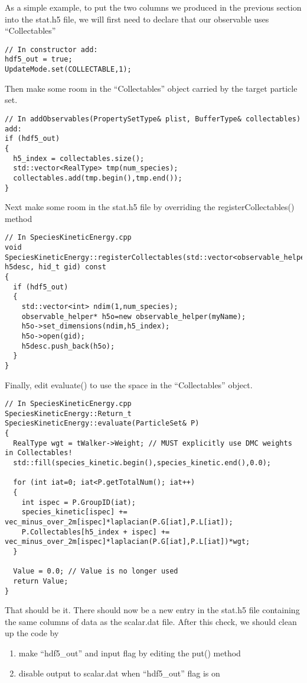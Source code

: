 As a simple example, to put the two columns we produced in the previous section into the stat.h5 file, we will first need to declare that our observable uses ``Collectables''
\begin{lstlisting}[style=C++]
// In constructor add: 
hdf5_out = true;
UpdateMode.set(COLLECTABLE,1);
\end{lstlisting}
Then make some room in the ``Collectables'' object carried by the target particle set.
\begin{lstlisting}[style=C++]
// In addObservables(PropertySetType& plist, BufferType& collectables) add:
if (hdf5_out)
{
  h5_index = collectables.size();
  std::vector<RealType> tmp(num_species);
  collectables.add(tmp.begin(),tmp.end());
}
\end{lstlisting}
Next make some room in the stat.h5 file by overriding the registerCollectables() method
\begin{lstlisting}[style=C++]
// In SpeciesKineticEnergy.cpp
void SpeciesKineticEnergy::registerCollectables(std::vector<observable_helper*>& h5desc, hid_t gid) const
{
  if (hdf5_out)
  {
    std::vector<int> ndim(1,num_species);
    observable_helper* h5o=new observable_helper(myName);
    h5o->set_dimensions(ndim,h5_index);
    h5o->open(gid);
    h5desc.push_back(h5o);
  }
}
\end{lstlisting}
Finally, edit evaluate() to use the space in the ``Collectables'' object.
\begin{lstlisting}[style=C++]
// In SpeciesKineticEnergy.cpp
SpeciesKineticEnergy::Return_t SpeciesKineticEnergy::evaluate(ParticleSet& P)
{
  RealType wgt = tWalker->Weight; // MUST explicitly use DMC weights in Collectables!
  std::fill(species_kinetic.begin(),species_kinetic.end(),0.0);

  for (int iat=0; iat<P.getTotalNum(); iat++)
  {
    int ispec = P.GroupID(iat);
    species_kinetic[ispec] += vec_minus_over_2m[ispec]*laplacian(P.G[iat],P.L[iat]);
    P.Collectables[h5_index + ispec] += vec_minus_over_2m[ispec]*laplacian(P.G[iat],P.L[iat])*wgt;
  }

  Value = 0.0; // Value is no longer used
  return Value;
}
\end{lstlisting}
That should be it. There should now be a new entry in the stat.h5 file containing the same columns of data as the scalar.dat file. After this check, we should clean up the code by
\begin{enumerate}
\item make ``hdf5\_out'' and input flag by editing the put() method
\item disable output to scalar.dat when ``hdf5\_out'' flag is on
\end{enumerate}


